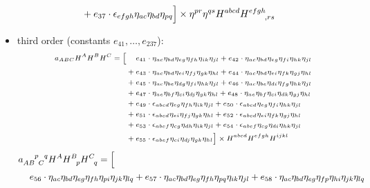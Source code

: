 \begin{itemize}
\begin{equation}
\begin{aligned}
    & + e_{37} \cdot \epsilon_{e f g h} \eta_{a c} \eta_{b d} \eta_{p q} \Big\rbrack \times \eta^{pr} \eta^{qs} H^{abcd} H^{efgh}_{\hphantom{efgh},rs}
  \end{aligned}
\end{equation}
\item third order (constants $e_{41},\dots,e_{237}$):
\begin{equation}
\scriptsize
  \begin{aligned}
    a_{ABC} H^A H^B H^C = \Big\lbrack & \hphantom{{}+{}} e_{41} \cdot \eta_{a c} \eta_{b d} \eta_{e g} \eta_{f h} \eta_{i k} \eta_{j l} + e_{42} \cdot \eta_{a c} \eta_{b d} \eta_{e g} \eta_{f i} \eta_{h k} \eta_{j l} \\
    & + e_{43} \cdot \eta_{a c} \eta_{b d} \eta_{e i} \eta_{f j} \eta_{g k} \eta_{h l} + e_{44} \cdot \eta_{a c} \eta_{b d} \eta_{e i} \eta_{f k} \eta_{g j} \eta_{h l} \\
    & + e_{45} \cdot \eta_{a c} \eta_{b e} \eta_{d g} \eta_{f i} \eta_{h k} \eta_{j l} + e_{46} \cdot \eta_{a c} \eta_{b e} \eta_{d i} \eta_{f g} \eta_{h k} \eta_{j l} \\
    & + e_{47} \cdot \eta_{a e} \eta_{b f} \eta_{c i} \eta_{d j} \eta_{g k} \eta_{h l} + e_{48} \cdot \eta_{a e} \eta_{b f} \eta_{c i} \eta_{d k} \eta_{g j} \eta_{h l} \\
    & + e_{49} \cdot \epsilon_{a b c d} \eta_{e g} \eta_{f h} \eta_{i k} \eta_{j l} + e_{50} \cdot \epsilon_{a b c d} \eta_{e g} \eta_{f i} \eta_{h k} \eta_{j l} \\
    & + e_{51} \cdot \epsilon_{a b c d} \eta_{e i} \eta_{f j} \eta_{g k} \eta_{h l} + e_{52} \cdot \epsilon_{a b c d} \eta_{e i} \eta_{f k} \eta_{g j} \eta_{h l} \\
    & + e_{53} \cdot \epsilon_{a b e f} \eta_{c g} \eta_{d h} \eta_{i k} \eta_{j l} + e_{54} \cdot \epsilon_{a b e f} \eta_{c g} \eta_{d i} \eta_{h k} \eta_{j l} \\
    & + e_{55} \cdot \epsilon_{a b e f} \eta_{c i} \eta_{d j} \eta_{g k} \eta_{h l} \Big\rbrack \times H^{abcd} H^{efgh} H^{ijkl}
  \end{aligned}
\end{equation}
\begingroup
\scriptsize
\allowdisplaybreaks
\begin{align}
    & a_{AB\hphantom pC}^{\hphantom{AB}p\hphantom Cq} H^A H^B_{\hphantom Bp} H^C_{\hphantom Cq} = \Big\lbrack \nonumber \\
    & \hphantom{{}+{}} e_{56} \cdot \eta_{a c} \eta_{b d} \eta_{e g} \eta_{f h} \eta_{p i} \eta_{j k} \eta_{l q} + e_{57} \cdot \eta_{a c} \eta_{b d} \eta_{e g} \eta_{f h} \eta_{p q} \eta_{i k} \eta_{j l} + e_{58} \cdot \eta_{a c} \eta_{b d} \eta_{e g} \eta_{f p} \eta_{h i} \eta_{j k} \eta_{l q} \nonumber \\

\end{align}
\end{itemize}
